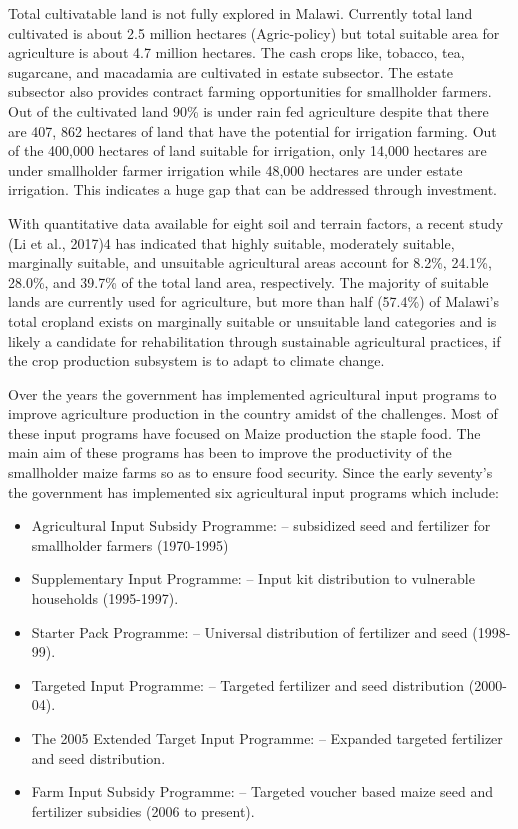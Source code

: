 \documentclass[
]{book}
\begin{document}
Total cultivatable land is not fully explored in Malawi. Currently total land cultivated is about 2.5 million hectares (Agric-policy) but total suitable area for
agriculture is about 4.7 million hectares. The cash crops like, tobacco, tea, sugarcane, and macadamia are cultivated in estate subsector. The estate subsector
also provides contract farming opportunities for smallholder farmers. Out of the cultivated land 90\% is under rain fed agriculture despite that there are 407,
862 hectares of land that have the potential for irrigation farming. Out of the 400,000 hectares of land suitable for irrigation, only 14,000 hectares are under
smallholder farmer irrigation while 48,000 hectares are under estate irrigation. This indicates a huge gap that can be addressed through investment.

With quantitative data available for eight soil and terrain factors, a recent study (Li et al., 2017)4 has indicated that highly suitable, moderately suitable,
marginally suitable, and unsuitable agricultural areas account for 8.2\%, 24.1\%, 28.0\%, and 39.7\% of the total land area, respectively. The majority of suitable
lands are currently used for agriculture, but more than half (57.4\%) of Malawi's total cropland exists on marginally suitable or unsuitable land categories and
is likely a candidate for rehabilitation through sustainable agricultural practices, if the crop production subsystem is to adapt to climate change.

Over the years the government has implemented agricultural input programs to improve agriculture production in the country amidst of the challenges. Most of
these input programs have focused on Maize production the staple food. The main aim of these programs has been to improve the productivity of the smallholder
maize farms so as to ensure food security. Since the early seventy's the government has implemented six agricultural input programs which include:

\begin{itemize}
\item
  Agricultural Input Subsidy Programme: -- subsidized seed and fertilizer for smallholder farmers (1970-1995)
\item
  Supplementary Input Programme: -- Input kit distribution to vulnerable households (1995-1997).
\item
  Starter Pack Programme: -- Universal distribution of fertilizer and seed (1998-99).
\item
  Targeted Input Programme: -- Targeted fertilizer and seed distribution (2000-04).
\item
  The 2005 Extended Target Input Programme: -- Expanded targeted fertilizer and seed distribution.
\item
  Farm Input Subsidy Programme: -- Targeted voucher based maize seed and fertilizer subsidies (2006 to present).
\end{itemize}
\end{document}
